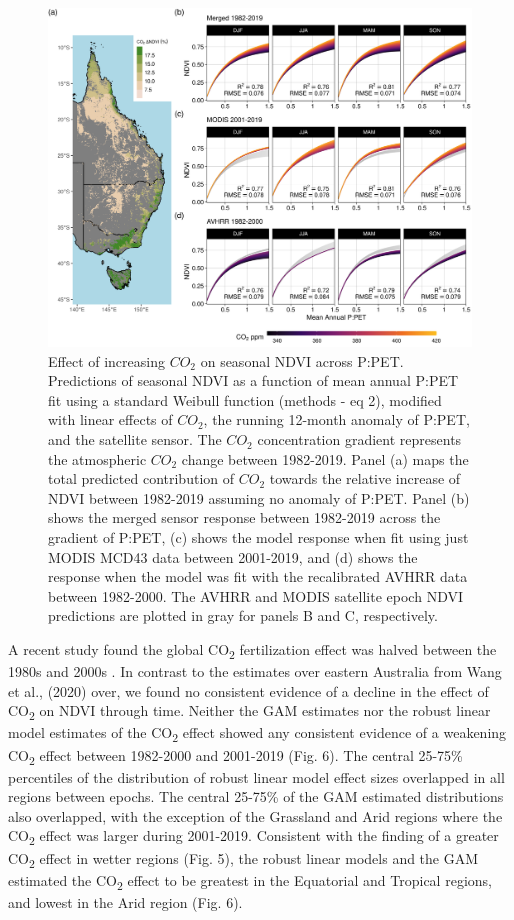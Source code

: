 \documentclass[gc, manuscript]{copernicus}
\begin{document}
\clearpage
\begin{figure}
\includegraphics[width=12cm]{../../figures/Fig5_n4_ndvi_map_weibull_ppet_x_co2_modeled_effect} \caption{Effect of increasing $CO_2$ on seasonal NDVI across P:PET. Predictions of seasonal NDVI as a function of mean annual P:PET fit using a standard Weibull function (methods - eq 2), modified with linear effects of $CO_2$, the running 12-month anomaly of P:PET, and the satellite sensor. The $CO_2$ concentration gradient represents the atmospheric $CO_2$ change between 1982-2019. Panel (a) maps the total predicted contribution of $CO_2$ towards the relative increase of NDVI between 1982-2019 assuming no anomaly of P:PET. Panel (b) shows the merged sensor response between 1982-2019 across the gradient of P:PET, (c) shows the model response when fit using just MODIS MCD43 data between 2001-2019, and (d) shows the response when the model was fit with the recalibrated AVHRR data between 1982-2000. The AVHRR and MODIS satellite epoch NDVI predictions are plotted in gray for panels B and C, respectively.}\label{fig:unnamed-chunk-4}
\end{figure}
\clearpage

A recent study found the global CO\textsubscript{2} fertilization effect
was halved between the 1980s and 2000s
\citep{wangRecentGlobalDecline2020}. In contrast to the estimates over
eastern Australia from Wang et al., (2020) over, we found no consistent
evidence of a decline in the effect of CO\textsubscript{2} on NDVI
through time. Neither the GAM estimates nor the robust linear model
estimates of the CO\textsubscript{2} effect showed any consistent
evidence of a weakening CO\textsubscript{2} effect between 1982-2000 and
2001-2019 (Fig. 6). The central 25-75\% percentiles of the distribution
of robust linear model effect sizes overlapped in all regions between
epochs. The central 25-75\% of the GAM estimated distributions also
overlapped, with the exception of the Grassland and Arid regions where
the CO\textsubscript{2} effect was larger during 2001-2019. Consistent
with the finding of a greater CO\textsubscript{2} effect in wetter
regions (Fig. 5), the robust linear models and the GAM estimated the
CO\textsubscript{2} effect to be greatest in the Equatorial and Tropical
regions, and lowest in the Arid region (Fig. 6).
\end{document}
